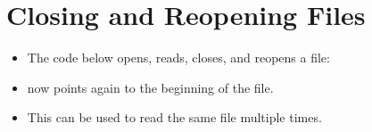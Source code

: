 \documentclass[letterpaper,10pt,english]{sphinxmanual}
\begin{document}
\section{Closing and Reopening Files}
\label{\detokenize{lecture_notes/lec13_files_web:closing-and-reopening-files}}\begin{itemize}
\item {} 
The code below opens, reads, closes, and reopens a file:

\begin{sphinxVerbatim}[commandchars=\\\{\}]
  


  
\end{sphinxVerbatim}

\item {} 
 now points again to the beginning of the file.

\item {} 
This can be used to read the same file multiple times.

\end{itemize}
\end{document}
